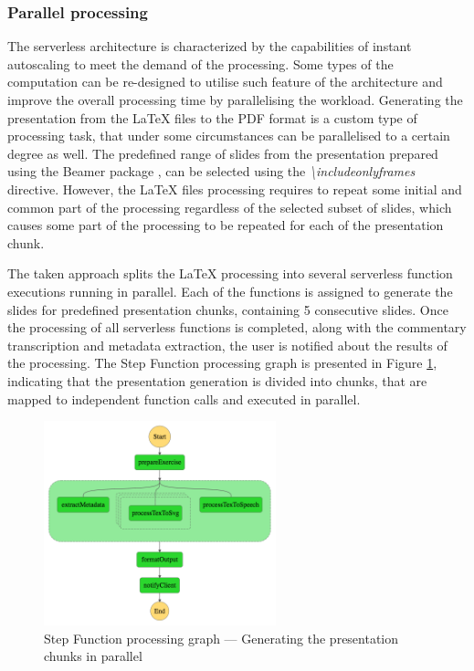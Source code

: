 \subsubsection{Parallel processing} \label{section:case-study-parallel-processing}

The serverless architecture is characterized by the capabilities of instant autoscaling to meet the demand of the processing.
Some types of the computation can be re-designed to utilise such feature of the architecture and improve the overall processing time by parallelising the workload.
Generating the presentation from the LaTeX files to the PDF format is a custom type of processing task, that under some circumstances can be parallelised to a certain degree as well.
The predefined range of slides from the presentation prepared using the Beamer package \cite{beamer}, can be selected using the \textit{\textbackslash includeonlyframes} directive.
However, the LaTeX files processing requires to repeat some initial and common part of the processing regardless of the selected subset of slides, which causes some part of the processing to be repeated for each of the presentation chunk.

The taken approach splits the LaTeX processing into several serverless function executions running in parallel. Each of the functions is assigned to generate the slides for predefined presentation chunks, containing 5 consecutive slides. Once the processing of all serverless functions is completed, along with the commentary transcription and metadata extraction, the user is notified about the results of the processing. The Step Function processing graph is presented in Figure \ref{fig:step-function-processing-the-presentation-in-parallel}, indicating that the presentation generation is divided into chunks, that are mapped to independent function calls and executed in parallel.

\begin{figure}[H]
    \centering
    \includegraphics[width=0.6\textwidth]{assets/04-serverless-for-web-apps/stepFunctionGraphParallel.png}
    \caption{Step Function processing graph --- Generating the presentation chunks in parallel}
    \label{fig:step-function-processing-the-presentation-in-parallel}
\end{figure}

